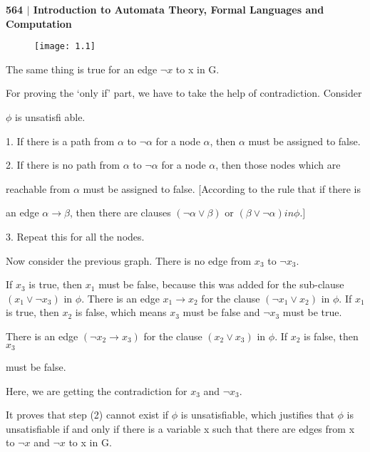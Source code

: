 \documentclass[10pt,a4paper]{book}
\begin{document}
\small

\begin{flushleft}
  \textsf{\textbf{564 $|$ Introduction to Automata Theory, Formal Languages and Computation}}
\end{flushleft}

\begin{figure}[h]
  \centering
  \texttt{[image: 1.1]}\\
\end{figure}

The same thing is true for an edge $\neg x$ to x in G.

For proving the ‘only if’ part, we have to take the help of contradiction. Consider

$\phi$ is unsatisfi able.

1. If there is a path from $\alpha$ to $\neg\alpha$ for a node $\alpha$, then $\alpha$ must be assigned to false.

2. If there is no path from $\alpha$ to $\neg\alpha$ for a node $\alpha$, then those nodes which are

reachable from $\alpha$ must be assigned to false. [According to the rule that if there is

an edge $\alpha \rightarrow \beta$, then there are clauses $(\neg\alpha \vee \beta)$ or $(\beta \vee \neg\alpha) in \phi.]$

3. Repeat this for all the nodes.

\quad

Now consider the previous graph. There is no edge from $x_{3}$ to $\neg x_{3}$.

If $x_{3}$ is true, then $x_{1}$ must be false, because this was added for the sub-clause $(x_{1} \vee \neg x_{3})$ in $\phi$. There is an edge $x_{1} \rightarrow x_{2}$ for the clause $(¬x_{1} \vee x_{2})$ in $\phi $. If $x_{1}$ is true, then $x_{2}$ is false, which means $x_{3}$ must be
false and $\neg x_{3}$ must be true.

There is an edge $(\neg x_{2} \rightarrow x_{3})$ for the clause $(x_{2} \vee x_{3})$ in $\phi$. If $x_{2}$ is false, then $x_{3}$

must be false.

Here, we are getting the contradiction for $x_{3}$ and $\neg x_{3}$.

It proves that step (2) cannot exist if $\phi$ is unsatisfiable, which justifies that $\phi$ is unsatisfiable if and only if there is a variable x such that there are edges from x to $\neg x$ and $\neg x$ to x in G.
\end{document}
